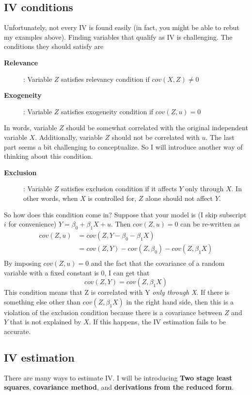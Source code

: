 \documentclass[12pt]{article}
\theoremstyle{definition}
\theoremstyle{property}
\theoremstyle{assumption}
\theoremstyle{example}
\theoremstyle{comment}
\begin{document}
\subsection{IV conditions}
Unfortunately, not every IV is found easily (in fact, you might be able to rebut my examples above). Finding variables that qualify as IV is challenging. The conditions they should satisfy are
\begin{description}
\item[\textbf{Relevance}]: Variable $Z$ satisfies relevancy condition if $cov(X,Z)\neq0$
\item[\textbf{Exogeneity}]: Variable $Z$ satisfies exogeneity condition if $cov(Z,u)=0$
\end{description}
In words, variable $Z$ should be somewhat correlated with the original independent variable $X$. Additionally, variable $Z$ should not be correlated with $u$. The last part seems a bit challenging to conceptualize. So I will introduce another way of thinking about this condition.
\begin{description}
\item[\textbf{Exclusion}]: Variable $Z$ satisfies exclusion condition if it affects $Y$ only through $X$. In other words, when $X$ is controlled for, $Z$ alone should not affect $Y$.
\end{description}
So how does this condition come in? Suppose that your model is (I skip subscript $i$ for convenience) $Y=\beta_0+\beta_1X+u$. Then $cov(Z,u)=0$ can be re-written as
\[
\begin{aligned}
cov(Z,u)&=cov(Z,Y-\beta_0-\beta_1X)\\
&=cov(Z,Y)-cov(Z,\beta_0)-cov(Z,\beta_1X)\\
\end{aligned}
\]
By imposing $cov(Z,u)=0$ and the fact that the covariance of a random variable with a fixed constant is 0, I can get that
\[
cov(Z,Y)=cov(Z,\beta_1X)
\]
This condition means that Z is correlated with Y \textit{only through X}. If there is something else other than $cov(Z,\beta_1X)$ in the right hand side, then this is a violation of the exclusion condition because there is a covariance between $Z$ and $Y$ that is not explained by $X$. If this happens, the IV estimation fails to be accurate. 

\subsection{IV estimation}
There are many ways to estimate IV. I will be introducing \textbf{Two stage least squares}, \textbf{covariance method}, and \textbf{derivations from the reduced form}. 
\end{document}
